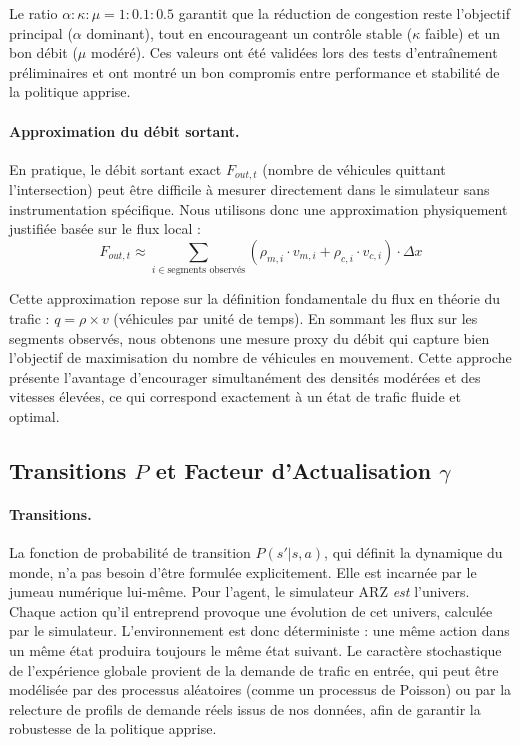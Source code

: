 Le ratio $\alpha : \kappa : \mu = 1 : 0.1 : 0.5$ garantit que la réduction de congestion reste l'objectif principal ($\alpha$ dominant), tout en encourageant un contrôle stable ($\kappa$ faible) et un bon débit ($\mu$ modéré). Ces valeurs ont été validées lors des tests d'entraînement préliminaires et ont montré un bon compromis entre performance et stabilité de la politique apprise.

\paragraph{Approximation du débit sortant.}
En pratique, le débit sortant exact $F_{out,t}$ (nombre de véhicules quittant l'intersection) peut être difficile à mesurer directement dans le simulateur sans instrumentation spécifique. Nous utilisons donc une approximation physiquement justifiée basée sur le flux local :
\begin{equation}
F_{out, t} \approx \sum_{i \in \text{segments observés}} \left( \rho_{m,i} \cdot v_{m,i} + \rho_{c,i} \cdot v_{c,i} \right) \cdot \Delta x
\end{equation}

Cette approximation repose sur la définition fondamentale du flux en théorie du trafic : $q = \rho \times v$ (véhicules par unité de temps). En sommant les flux sur les segments observés, nous obtenons une mesure proxy du débit qui capture bien l'objectif de maximisation du nombre de véhicules en mouvement. Cette approche présente l'avantage d'encourager simultanément des densités modérées et des vitesses élevées, ce qui correspond exactement à un état de trafic fluide et optimal.

\subsection{Transitions $P$ et Facteur d'Actualisation $\gamma$}
\label{subsec:transitions_gamma}

\paragraph{Transitions.} La fonction de probabilité de transition $P(s'|s,a)$, qui définit la dynamique du monde, n'a pas besoin d'être formulée explicitement. Elle est incarnée par le jumeau numérique lui-même. Pour l'agent, le simulateur ARZ \textit{est} l'univers. Chaque action qu'il entreprend provoque une évolution de cet univers, calculée par le simulateur. L'environnement est donc déterministe : une même action dans un même état produira toujours le même état suivant. Le caractère stochastique de l'expérience globale provient de la demande de trafic en entrée, qui peut être modélisée par des processus aléatoires (comme un processus de Poisson) ou par la relecture de profils de demande réels issus de nos données, afin de garantir la robustesse de la politique apprise.

